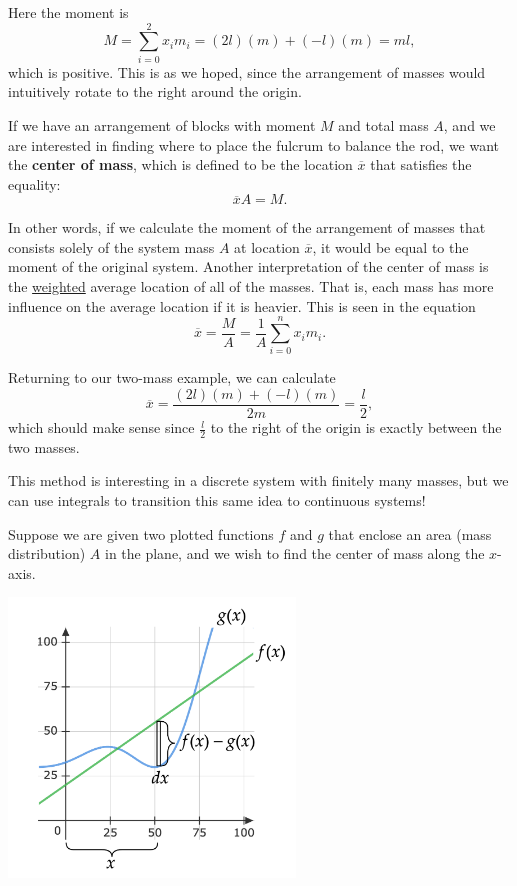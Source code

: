 \vspace{0.5cm}

Here the moment is
$$M=\sum_{i=0}^2x_im_i=(2l)(m)+(-l)(m)=ml,$$
which is positive. This is as we hoped, since the arrangement of masses would intuitively rotate to the right around the origin.

If we have an arrangement of blocks with moment $M$ and total mass $A$, and we are interested in finding where to place the fulcrum to balance the rod, we want the \textbf{center of mass}, which is defined to be the location $\overline{x}$ that satisfies the equality:
$$
\overline{x}A=M.
$$

In other words, if we calculate the moment of the arrangement of masses that consists solely of the system mass $A$ at location $\overline{x}$, it would be equal to the moment of the original system. Another interpretation of the center of mass is the \underline{weighted} average location of all of the masses. That is, each mass has more influence on the average location if it is heavier. This is seen in the equation
$$\overline{x}=\frac{M}{A}=\frac{1}{A}\sum_{i=0}^nx_im_i.$$


Returning to our two-mass example, we can calculate
$$\overline{x}=\frac{(2l)(m)+(-l)(m)}{2m}=\frac{l}{2},$$
which should make sense since $\frac{l}{2}$ to the right of the origin is exactly between the two masses.

This method is interesting in a discrete system with finitely many masses, but we can use integrals to transition this same idea to continuous systems!

Suppose we are given two plotted functions $f$ and $g$ that enclose an area (mass distribution) $A$ in the plane, and we wish to find the center of mass along the $x$-axis.


\begin{center}
\includegraphics[width=3in]{img/moments_plot1.png}
\end{center}

